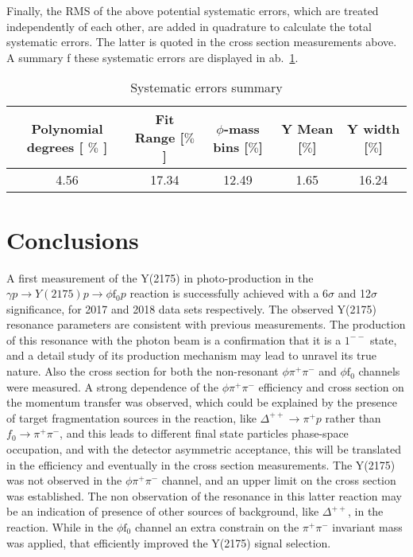 Finally, the RMS of the above potential systematic errors, which are treated independently of each other, are added in quadrature to calculate the total systematic errors. The latter is quoted in the cross section measurements above. A summary f these systematic errors are displayed in ab.~\ref{tab.4.6}.

\begin{table}[!htbp]
    \centering
    \caption{Systematic errors summary}
    \label{tab.4.6}
    \begin{tabular}{|c|c|c|c|c|}
        \hline
        Polynomial degrees [ $\%$ ] & Fit Range [$\%$] & $\phi$-mass bins [$\%$]  & Y Mean [$\%$] & Y width [$\%$] \\
        \hline
        4.56 & 17.34 & 12.49 & 1.65 & 16.24 \\
        \hline
    \end{tabular}
\end{table}

\section{Conclusions}
\label{p.4.7}

A first measurement of the Y(2175) in photo-production in the $\gamma p \rightarrow Y(2175) p \rightarrow \phi \mathrm{f}_0 p$ reaction is successfully achieved with a 6$\sigma$ and 12$\sigma$ significance, for 2017 and 2018 data sets respectively. The observed Y(2175) resonance parameters are consistent with previous measurements. The production of this resonance with the photon beam is a confirmation that it is a $1^{--}$ state, and a detail study of its production mechanism may lead to unravel its true nature. Also the cross section for both the non-resonant $\phi \pi^+\pi^-$ and $\phi \mathrm{f}_0$ channels were measured. A strong dependence of the $\phi \pi^+\pi^-$ efficiency and cross section on the momentum transfer was observed, which could be explained by the presence of target fragmentation sources in the reaction, like $\Delta^{++} \rightarrow \pi^+ p$ rather than ${f}_0 \rightarrow \pi^+\pi^-$, and this leads to different final state particles phase-space occupation, and with the detector asymmetric acceptance, this will be translated in the efficiency and eventually in the cross section measurements. The Y(2175) was not observed in the $\phi \pi^+\pi^-$ channel, and an upper limit on the cross section was established. The non observation of the resonance in this latter reaction may be an indication of presence of other sources of background, like $\Delta^{++}$, in the reaction. While in the $\phi \mathrm{f}_0$ channel an extra constrain on the $\pi^+\pi^-$ invariant mass was applied, that efficiently improved the Y(2175) signal selection.
